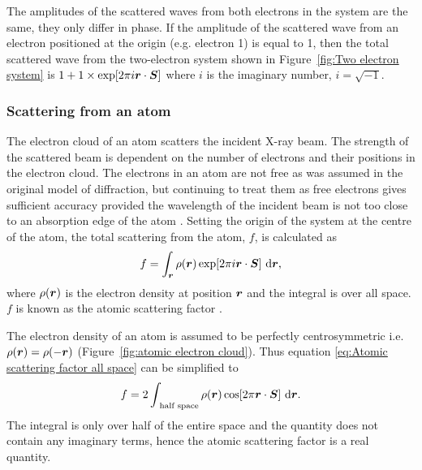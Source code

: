             The amplitudes of the scattered waves from both electrons in the system are the same, they only differ in phase.
            If the amplitude of the scattered wave from an electron positioned at the origin (e.g. electron 1) is equal to 1, then the total scattered wave from the two-electron system shown in Figure~\ref{fig:Two electron system} is $1 + 1 \times \exp[2 \pi i \boldsymbol{r} \cdot \boldsymbol{S}]$ where $i$ is the imaginary number, $i = \sqrt{-1}$.

        \subsubsection{Scattering from an atom}
        \label{subs:Scattering from an atom}
            The electron cloud of an atom scatters the incident X-ray beam.
            The strength of the scattered beam is dependent on the number of electrons and their positions in the electron cloud.
            The electrons in an atom are not free as was assumed in the original model of diffraction, but continuing to treat them as free electrons gives sufficient accuracy provided the wavelength of the incident beam is not too close to an absorption edge of the atom \cite{drenth2012}.
            Setting the origin of the system at the centre of the atom, the total scattering from the atom, $f$, is calculated as
            \begin{equation}
                f = \int_{\boldsymbol{r}} \rho(\boldsymbol{r}) \exp[2 \pi i \boldsymbol{r} \cdot \boldsymbol{S}]\ \mathrm{d}\boldsymbol{r},
                \label{eq:Atomic scattering factor all space}
            \end{equation}
            where $\rho(\boldsymbol{r})$ is the electron density at position $\boldsymbol{r}$ and the integral is over all space. $f$ is known as the atomic scattering factor \cite{drenth1999}.

            The electron density of an atom is assumed to be perfectly centrosymmetric i.e. $\rho(\boldsymbol{r}) = \rho(-\boldsymbol{r})$ (Figure~\ref{fig:atomic electron cloud}).
            Thus equation \ref{eq:Atomic scattering factor all space} can be simplified to
            \begin{equation}
                f = 2 \int_{\text{ half space}} \rho(\boldsymbol{r}) \cos[2 \pi \boldsymbol{r} \cdot \boldsymbol{S}]\ \mathrm{d}\boldsymbol{r}.
            \end{equation}
            The integral is only over half of the entire space and the quantity does not contain any imaginary terms, hence the atomic scattering factor is a real quantity.

